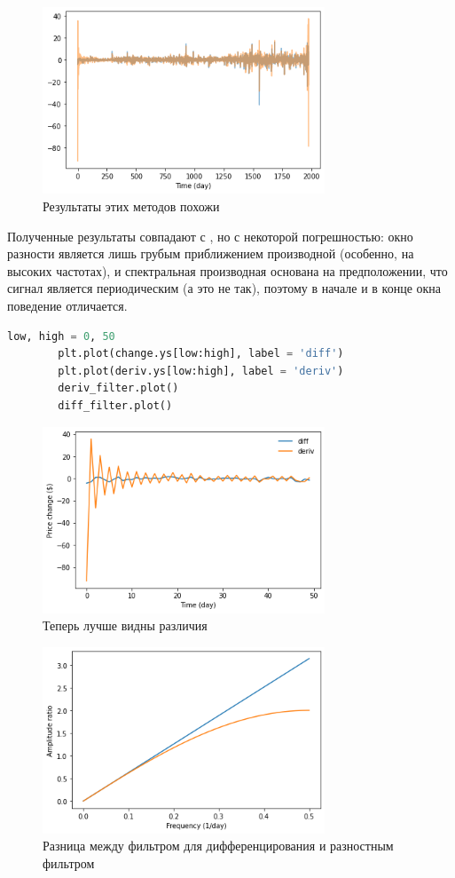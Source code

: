 \documentclass[a4paper, 12pt]{report}
\begin{document}
	\begin{figure}[H]
		\centering
		\includegraphics[width=0.75\textwidth]{dif3.png}
		\caption{Результаты этих методов похожи}
		\label{fig:dif3}
	\end{figure}
	Полученные результаты совпадают с , но с некоторой погрешностью: окно разности является лишь грубым приближением производной (особенно, на высоких частотах), и спектральная производная основана на предположении, что сигнал является периодическим (а это не так), поэтому в начале и в конце окна поведение отличается.
	\begin{lstlisting}[language=Python,caption=Увеличим масштаб]
		low, high = 0, 50
		plt.plot(change.ys[low:high], label = 'diff')
		plt.plot(deriv.ys[low:high], label = 'deriv')
		deriv_filter.plot()
		diff_filter.plot()
	\end{lstlisting}
	\begin{figure}[H]
		\centering
		\includegraphics[width=0.75\textwidth]{dif4.png}
		\caption{Теперь лучше видны различия}
		\label{fig:dif4}
	\end{figure}
	\begin{figure}[H]
		\centering
		\includegraphics[width=0.75\textwidth]{dif5.png}
		\caption{Разница между фильтром для дифференцирования и разностным фильтром}
		\label{fig:dif5}
	\end{figure}	
\end{document}
